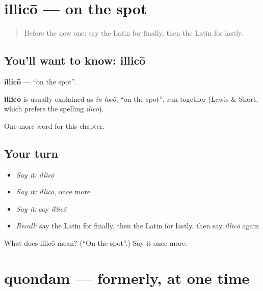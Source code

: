 \section[illicō]{illicō — on the spot}

\label{lesson:LA-C208-illico}



\begin{quote}
Before the new one: say the Latin for finally, then the Latin for lastly.
\end{quote}

\subsection*{You'll want to know: illicō}
\textbf{illicō} — \textquotedblleft{}on the spot\textquotedblright{}.

\begin{cousinweb}
\textbf{illicō} is usually explained as \emph{in locō}, \textquotedblleft{}on the spot\textquotedblright{}, run together (Lewis \& Short, which prefers the spelling \emph{īlicō}).
\end{cousinweb}

\begin{grammarlens}[title={What you've built}]
One more word for this chapter.
\end{grammarlens}

\subsection*{Your turn}
\begin{itemize}
\raggedright
  \item \emph{Say it:} \emph{illicō}
  \item \emph{Say it:} \emph{illicō}, once more
  \item \emph{Say it:} say \emph{illicō}
  \item \emph{Recall:} say the Latin for finally, then the Latin for lastly, then say \emph{illicō} again
\end{itemize}

\begin{tcolorbox}[breakable,colback=teal!4,colframe=teal!35!black,title={Before you move on}]
What does illicō mean? (\textquotedblleft{}On the spot\textquotedblright{}.) Say it once more.
\end{tcolorbox}
\section[quondam]{quondam — formerly, at one time}


